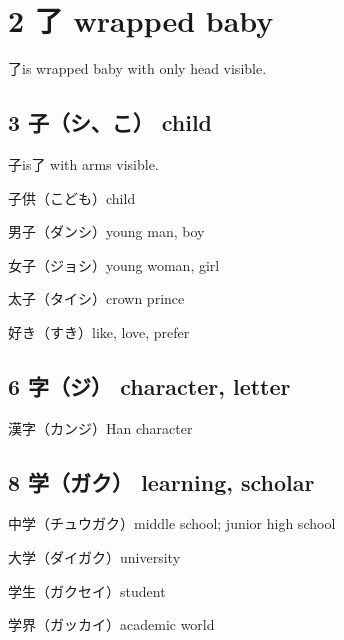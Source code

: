 \chapter{2 了 wrapped baby}

了is wrapped baby with only head visible.

\section{3 子（シ、こ） child}

子is了 with arms visible.

子供（こども）child

男子（ダンシ）young man, boy

女子（ジョシ）young woman, girl

太子（タイシ）crown prince

好き（すき）like, love, prefer

\section{6 字（ジ） character, letter}

漢字（カンジ）Han character

\section{8 学（ガク） learning, scholar}

中学（チュウガク）middle school; junior high school

大学（ダイガク）university

学生（ガクセイ）student

学界（ガッカイ）academic world
